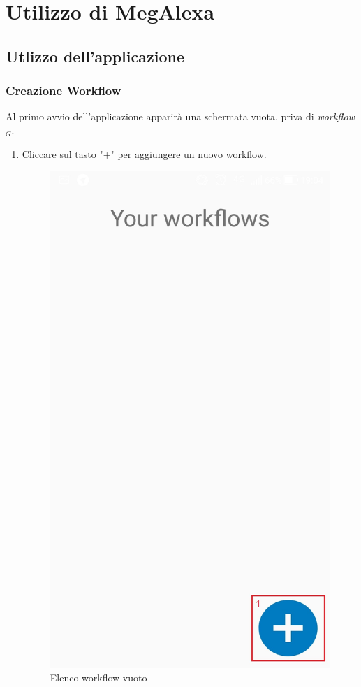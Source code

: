 \chapter{Utilizzo di MegAlexa}
\label{utilizzo}
\section{Utlizzo dell'applicazione}
\subsection{Creazione Workflow}
Al primo avvio dell'applicazione apparirà una schermata vuota, priva di \textit{workflow$_{G}$}.

\begin{enumerate}
\item Cliccare sul tasto "+" per aggiungere un nuovo workflow.

	\begin{figure}[!ht]
		\centering
		\includegraphics[scale=0.2]{images/HomeWorkflowEmpty.jpg}
		\caption{Elenco workflow vuoto}
	\end{figure}


\end{enumerate}
